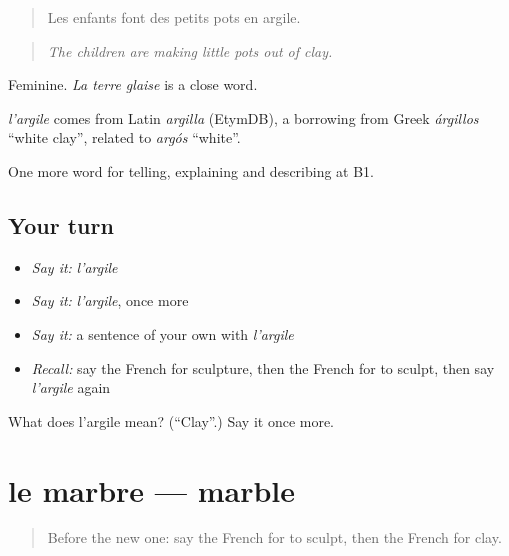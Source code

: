 \begin{quote}
Les enfants font des petits pots en argile.
\end{quote}

\begin{quote}
\emph{The children are making little pots out of clay.}
\end{quote}

Feminine. \emph{La terre glaise} is a close word.

\begin{cousinweb}
\emph{l'argile} comes from Latin \emph{argilla} (EtymDB), a borrowing from Greek \emph{árgillos} \textquotedblleft{}white clay\textquotedblright{}, related to \emph{argós} \textquotedblleft{}white\textquotedblright{}.
\end{cousinweb}

\begin{grammarlens}[title={What you've built}]
One more word for telling, explaining and describing at B1.
\end{grammarlens}

\subsection*{Your turn}
\begin{itemize}
\raggedright
  \item \emph{Say it:} \emph{l'argile}
  \item \emph{Say it:} \emph{l'argile}, once more
  \item \emph{Say it:} a sentence of your own with \emph{l'argile}
  \item \emph{Recall:} say the French for sculpture, then the French for to sculpt, then say \emph{l'argile} again
\end{itemize}

\begin{tcolorbox}[breakable,colback=teal!4,colframe=teal!35!black,title={Before you move on}]
What does l'argile mean? (\textquotedblleft{}Clay\textquotedblright{}.) Say it once more.
\end{tcolorbox}
\section[le marbre]{le marbre — marble}

\label{lesson:FR-C517-marbre}



\begin{quote}
Before the new one: say the French for to sculpt, then the French for clay.
\end{quote}

